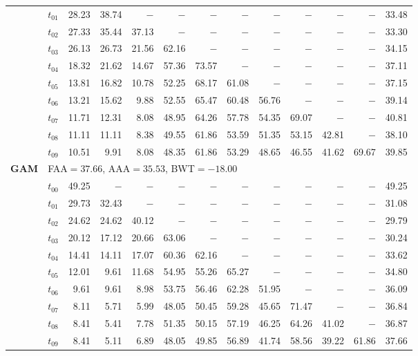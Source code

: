 \begin{table}[ht]
\begin{tabular}{@{}l l r r r r r r r r r r r@{}}
 & $t_{01}$ & 28.23 & 38.74 & $-$ & $-$ & $-$ & $-$ & $-$ & $-$ & $-$ & $-$ & 33.48 \\
 & $t_{02}$ & 27.33 & 35.44 & 37.13 & $-$ & $-$ & $-$ & $-$ & $-$ & $-$ & $-$ & 33.30 \\
 & $t_{03}$ & 26.13 & 26.73 & 21.56 & 62.16 & $-$ & $-$ & $-$ & $-$ & $-$ & $-$ & 34.15 \\
 & $t_{04}$ & 18.32 & 21.62 & 14.67 & 57.36 & 73.57 & $-$ & $-$ & $-$ & $-$ & $-$ & 37.11 \\
 & $t_{05}$ & 13.81 & 16.82 & 10.78 & 52.25 & 68.17 & 61.08 & $-$ & $-$ & $-$ & $-$ & 37.15 \\
 & $t_{06}$ & 13.21 & 15.62 & 9.88 & 52.55 & 65.47 & 60.48 & 56.76 & $-$ & $-$ & $-$ & 39.14 \\
 & $t_{07}$ & 11.71 & 12.31 & 8.08 & 48.95 & 64.26 & 57.78 & 54.35 & 69.07 & $-$ & $-$ & 40.81 \\
 & $t_{08}$ & 11.11 & 11.11 & 8.38 & 49.55 & 61.86 & 53.59 & 51.35 & 53.15 & 42.81 & $-$ & 38.10 \\
 & $t_{09}$ & 10.51 & 9.91 & 8.08 & 48.35 & 61.86 & 53.29 & 48.65 & 46.55 & 41.62 & 69.67 & 39.85 \\
\midrule
\multirow{11}{*}{\textbf{GAM}} & \multicolumn{12}{l}{\quad\small FAA$=37.66$,\; AAA$=35.53$,\; BWT$=-18.00$} \\
 & $t_{00}$ & 49.25 & $-$ & $-$ & $-$ & $-$ & $-$ & $-$ & $-$ & $-$ & $-$ & 49.25 \\
 & $t_{01}$ & 29.73 & 32.43 & $-$ & $-$ & $-$ & $-$ & $-$ & $-$ & $-$ & $-$ & 31.08 \\
 & $t_{02}$ & 24.62 & 24.62 & 40.12 & $-$ & $-$ & $-$ & $-$ & $-$ & $-$ & $-$ & 29.79 \\
 & $t_{03}$ & 20.12 & 17.12 & 20.66 & 63.06 & $-$ & $-$ & $-$ & $-$ & $-$ & $-$ & 30.24 \\
 & $t_{04}$ & 14.41 & 14.11 & 17.07 & 60.36 & 62.16 & $-$ & $-$ & $-$ & $-$ & $-$ & 33.62 \\
 & $t_{05}$ & 12.01 & 9.61 & 11.68 & 54.95 & 55.26 & 65.27 & $-$ & $-$ & $-$ & $-$ & 34.80 \\
 & $t_{06}$ & 9.61 & 9.61 & 8.98 & 53.75 & 56.46 & 62.28 & 51.95 & $-$ & $-$ & $-$ & 36.09 \\
 & $t_{07}$ & 8.11 & 5.71 & 5.99 & 48.05 & 50.45 & 59.28 & 45.65 & 71.47 & $-$ & $-$ & 36.84 \\
 & $t_{08}$ & 8.41 & 5.41 & 7.78 & 51.35 & 50.15 & 57.19 & 46.25 & 64.26 & 41.02 & $-$ & 36.87 \\
 & $t_{09}$ & 8.41 & 5.11 & 6.89 & 48.05 & 49.85 & 56.89 & 41.74 & 58.56 & 39.22 & 61.86 & 37.66 \\

\end{tabular}
\end{table}
